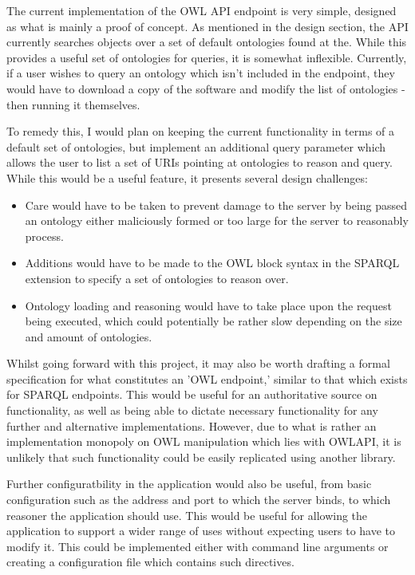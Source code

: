 \documentclass{article}
\begin{document}
The current implementation of the OWL API endpoint is very simple, designed as
what is mainly a proof of concept. As mentioned in the design
section, the API currently searches objects over a set of default ontologies
found at the\cite{obofoundry}. While this provides a useful set of
ontologies for queries, it is somewhat inflexible. Currently, if a user wishes
to query an ontology which isn't included in the endpoint, they
would have to download a copy of the software and modify the list of ontologies
- then running it themselves.

To remedy this, I would plan on keeping the current functionality in terms of a
default set of ontologies, but implement an additional query
parameter which allows the user to list a set of URIs pointing at ontologies to
reason and query. While this would be a useful feature, it
presents several design challenges: 

\begin{itemize}
    \item Care would have to be taken to prevent damage to the server by being
    passed an ontology either maliciously formed or too large for the server to
    reasonably process.
    \item Additions would have to be made to the OWL block syntax in the SPARQL
    extension to specify a set of ontologies to reason over.
    \item Ontology loading and reasoning would have to take place upon the
    request being executed, which could potentially be rather slow depending on
    the size and amount of ontologies.
\end{itemize}

Whilst going forward with this project, it may also be worth drafting a formal
specification for what constitutes an 'OWL endpoint,' similar
to that which exists for SPARQL endpoints. This would be useful for an
authoritative source on functionality, as well as being able
to dictate necessary functionality for any further and alternative
implementations. However, due to what is rather an implementation monopoly on
OWL manipulation which lies with OWLAPI, it is unlikely that such functionality
could be easily replicated using another library.

Further configuratbility in the application would also be useful, from basic
configuration such as the address and port to which the server binds, to which
reasoner the application should use. This would be useful for allowing the
application to support a wider range of uses without expecting users to have to
modify it. This could be implemented either with command line arguments or
creating a configuration file which contains such directives.
\end{document}
